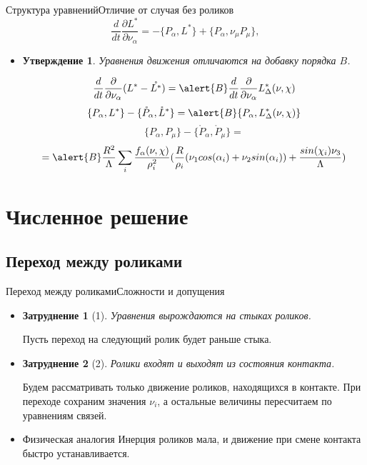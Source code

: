 \documentclass{beamer}
\newtheorem{stmt}{Утверждение}
\newtheorem{prblm}{Затруднение}
\begin{document}
\begin{frame}{Структура уравнений}{Отличие от случая без роликов}
  $$ \frac{d}{dt}\frac{\partial L^{*}}{\partial \nu_\alpha} = - \{P_\alpha, L^{*}\} + \{P_\alpha, \nu_\mu P_\mu\}, $$
  \begin{itemize}
  \item {
    \begin{stmt}
    Уравнения движения отличаются на добавку порядка $B$.
    \end{stmt}
    $$ \frac{d}{dt}\frac{\partial }{\partial \nu_\alpha}(L^{*} - \mathring{L^{*}}) = \alert{B}\frac{d}{dt}\frac{\partial}{\partial \nu_\alpha}L^{*}_\Delta(\nu, \chi) $$
    $$ \{P_\alpha, L^{*}\} - \{\mathring{P}_\alpha, \mathring{L}^{*}\} = \alert{B}\{ P_\alpha, L^{*}_\Delta(\nu, \chi) \} $$
    $$ \{P_\alpha, P_\mu\} - \{\mathring{P}_\alpha, \mathring{P}_\mu\}  = $$
    $$ = \alert{B}\frac{R^2}{\Lambda}\sum_i\frac{f_\alpha(\nu, \chi)}{\rho^2_i}(\frac{R}{\rho_i}(\nu_1cos(\alpha_i) + \nu_2sin(\alpha_i)) + \frac{sin(\chi_i)\nu_3}{\Lambda})$$
  }
  \end{itemize}
\end{frame}

\section{Численное решение}

\subsection{Переход между роликами}

\begin{frame}{Переход между роликами}{Сложности и допущения}
  \begin{itemize}
  \item {
    \begin{prblm}[1]\label{p1}
    Уравнения вырождаются на стыках роликов.
    \end{prblm}
    Пусть переход на следующий ролик будет раньше стыка.
  }
  \item {
    \begin{prblm}[2]\label{p2}
    Ролики входят и выходят из состояния контакта.
    \end{prblm}
    Будем рассматривать только движение роликов, находящихся в контакте. При переходе сохраним значения $\nu_i$, а остальные величины пересчитаем по уравнениям связей.
  }
  \item {
    \begin{block}{Физическая аналогия}
    Инерция роликов мала, и движение при смене контакта быстро устанавливается.
    \end{block}
  }
  \end{itemize}
\end{frame}
\end{document}
